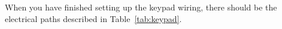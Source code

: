 %
%

When you have finished setting up the keypad wiring, there should be the electrical paths described in Table~\ref{tab:keypad}.

